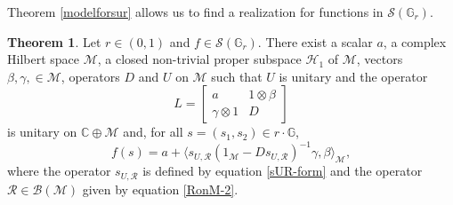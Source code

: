 \documentclass[12pt,reqno]{amsart}
\numberwithin{equation}{section}
\theoremstyle{definition}
\newtheorem{thm}[equation]{Theorem}
\begin{document}
Theorem \ref{modelforsur} allows us to find a realization for functions in $\mathcal{S}(\mathbb{G}_{r})$. 
\begin{thm}\label{realisationformulaforrG}
Let $ r\in (0,1)$ and $f \in \mathcal{S}(\mathbb{G}_{r})$. There exist a scalar $a$,  
 a complex Hilbert space $\mathcal{M}$,  a closed non-trivial proper subspace  $\mathcal{H}_{1}$ of $\mathcal{M}$,
 vectors $\beta, \gamma, \in \mathcal{M}$, operators $D$ and $U$ on $\mathcal{M}$ such that $U$ is unitary and the operator 
\begin{equation}\label{realizationunitaryforgr}
L=\begin{bmatrix}
    a       & 1\otimes \beta \\
    \gamma \otimes 1       & D 
\end{bmatrix}
\end{equation}
is unitary on $\mathbb{C}\oplus \mathcal{M}$ and, for all $s=(s_{1},s_{2})\in r\cdot\mathbb{G}$,
\begin{equation}\label{realization-1}
f(s)=a+\langle s_{U,\mathcal{R}}(1_{\mathcal{M}}-Ds_{U,\mathcal{R}})^{-1}\gamma, \beta \rangle_{\mathcal{M}},
\end{equation}
where  the operator $s_{U,\mathcal{R}}$ is defined by 
equation \eqref{sUR-form} and the operator $\mathcal{R} \in\mathcal{B(M)}$ given by equation \eqref{RonM-2}.
\end{thm}
\end{document}
